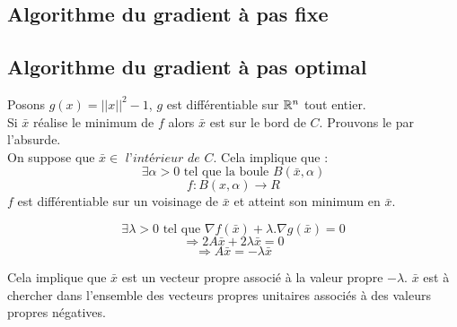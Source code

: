\subsection{Algorithme du gradient à pas fixe}
\subsection{Algorithme du gradient à pas optimal}

	





Posons $ g(x) = ||x||^2 - 1 $, $g$ est différentiable sur $\mathbb{R}^n$ tout entier.\\
Si $\bar{x}$ réalise le minimum de $f$ alors $\bar{x}$ est sur le bord de $C$. Prouvons le par l'absurde.\\
On suppose que $\bar{x} \in \textit{ l'intérieur de }C $.
Cela implique que : \[ \exists \alpha>0 \text{ tel que la boule } B(\bar{x},\alpha)  \]
\[ f : B(x,\alpha) \rightarrow R \]
$f$ est différentiable sur un voisinage de $\bar{x}$ et atteint son minimum en $\bar{x}$.


\[ \exists \lambda > 0 \text{ tel que } \nabla f(\bar{x}) + \lambda.\nabla g(\bar{x}) = 0 \]
\[ \Rightarrow 2A\bar{x} + 2\lambda\bar{x} = 0 \]
\[ \Rightarrow A\bar{x} = - \lambda\bar{x}\]

Cela implique que $\bar{x}$ est un vecteur propre associé à la valeur propre $-\lambda$. $\bar{x}$ est à chercher dans l'ensemble des vecteurs propres unitaires associés à des valeurs propres négatives.












